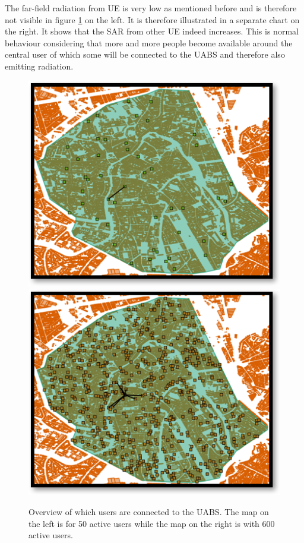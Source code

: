 The far-field radiation from \gls{UE} is very low as mentioned before and is therefore not visible in figure \ref{fig:connectionMap} 
on the left. It is therefore illustrated in a separate chart on the right. 
It shows that the \gls{SAR}  from other \gls{UE} indeed increases. This is normal 
behaviour considering that more and more people become available around the central user of which some will be connected to the \gls{UABS}
and therefore also emitting radiation.

\begin{figure}[!htb]
  \includegraphics[width=\linewidth]{../images/connectionsMap50Users.png}
\endminipage\hfill
{}%
  \includegraphics[width=\linewidth]{../images/connectionsMap600Users.png}
\endminipage
  \caption{Overview of which users are connected to the \gls{UABS}. The map on the left is for 50 active users while the map on the right is with 600 active users.}
  \label{fig:connectionMap}
\end{figure}
